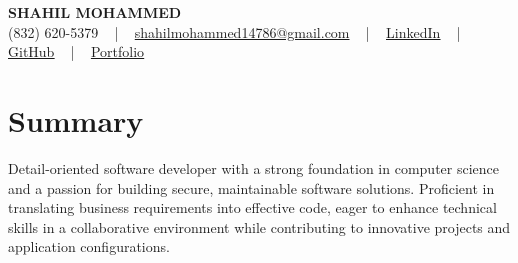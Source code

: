 \documentclass[letterpaper,10pt]{article}
\begin{document}
\begin{center}
    {\fontsize{14pt}{12pt}\selectfont \textbf{\MakeUppercase{Shahil Mohammed}}}\\ \vspace{2pt}
    \fontsize{10pt}{12pt}\selectfont (832) 620-5379 ~ | ~ \href{mailto:shahilmohammed14786@gmail.com}{shahilmohammed14786@gmail.com} ~ | ~  
    \href{https://www.linkedin.com/in/shahil-mohammed-9652931a1/}{\color{blue}\underline{LinkedIn}}  ~ | ~ 
    \href{https://github.com/freakbeast14}{\color{blue}\underline{GitHub}} ~ | ~ 
    \href{https://shahil-mohammed.netlify.app/}{\color{blue}\underline{Portfolio}}
    \vspace{-8pt}
\end{center}

\section{Summary}
\vspace{-2pt}\fontsize{8pt}{9pt}\selectfont
Detail-oriented software developer with a strong foundation in computer science and a passion for building secure, maintainable software solutions. Proficient in translating business requirements into effective code, eager to enhance technical skills in a collaborative environment while contributing to innovative projects and application configurations.
 \vspace{-5pt}
 
\vspace{-2pt}
\end{document}
